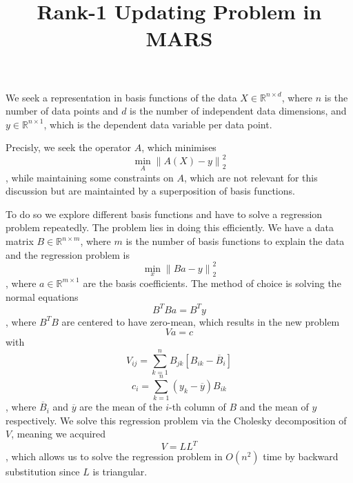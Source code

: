 \documentclass{article}
\title{Rank-1 Updating Problem in MARS}
\begin{document}
\maketitle

\noindent We seek a representation in basis functions of the data $X \in \mathbb{R}^{n \times d}$, where $n$ is the number of data points and $d$ is the number of independent data dimensions, and $y \in \mathbb{R}^{n \times 1}$, which is the dependent data variable per data point.
\par
Precisly, we seek the operator $A$, which minimises
\begin{equation}
    \min_{A} \left\| A(X) - y \right\|_2^2
\end{equation}
, while maintaining some constraints on $A$, which are not relevant for this discussion but are maintainted by a superposition of basis functions.
\par
To do so we explore different basis functions and have to solve a regression problem repeatedly. The problem lies in doing this efficiently. We have a data matrix $B \in \mathbb{R}^{n \times m}$, where $m$ is the number of basis functions to explain the data and the regression problem is
\begin{equation}
    \min_{x} \left\| Ba - y \right\|_2^2
\end{equation}
, where $a \in \mathbb{R}^{m \times 1}$ are the basis coefficients. The method of choice is solving the normal equations
\begin{equation}
    B^TBa=B^Ty
\end{equation}
, where $B^TB$ are centered to have zero-mean, which results in the new problem 
\begin{equation}
    Va=c
\end{equation}
with 
\begin{equation}
    V_{ij} = \sum_{k=1}^{n} B_{jk}\left[B_{ik} - \overline{B}_{i}\right]
\end{equation}
\begin{equation}
    c_i = \sum_{k=1}^{n} (y_k - \overline{y})B_{ik}
\end{equation}, where $\overline{B}_{i}$ and $\overline{y}$ are the mean of the $i$-th column of $B$ and the mean of $y$ respectively. We solve this regression problem via the Cholesky decomposition of $V$, meaning we acquired
\begin{equation}
    V = LL^T
\end{equation}
, which allows us to solve the regression problem in $O(n^2)$ time by backward substitution since $L$ is triangular.
\end{document}
